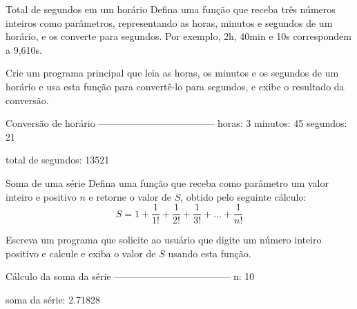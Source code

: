 \documentclass[11pt]{practice}
\begin{document}
\begin{task}[breakable]{Total de segundos em um horário}{}
  Defina uma função que receba três números inteiros como parâmetros,
  representando as horas, minutos e segundos de um horário, e os
  converte para segundos. Por exemplo, 2h, 40min e 10s correspondem a
  9,610s.

  Crie um programa principal que leia as horas, os minutos e os segundos
  de um horário e usa esta função para convertê-lo para segundos, e
  exibe o resultado da conversão.

  \begin{runexample}
Conversão de horário
------------------------------------
horas: 3
minutos: 45
segundos: 21

total de segundos: 13521
  \end{runexample}

  \tcblower
  \solution
\end{task}

\begin{task}[breakable]{Soma de uma série}{}
  Defina uma função que receba como parâmetro um valor inteiro e
  positivo $n$ e retorne o valor de $S$, obtido pelo seguinte cálculo:
  \[ S = 1 + \frac{1}{1!} + \frac{1}{2!} + \frac{1}{3!} + \ldots + \frac{1}{n!} \]

  Escreva um programa que solicite ao usuário que digite um número
  inteiro positivo e calcule e exiba o valor de $S$ usando esta função.

  \begin{runexample}
Cálculo da soma da série
------------------------------------
n: 10

soma da série: 2.71828
  \end{runexample}

  \tcblower
  \solution
\end{task}
\end{document}
